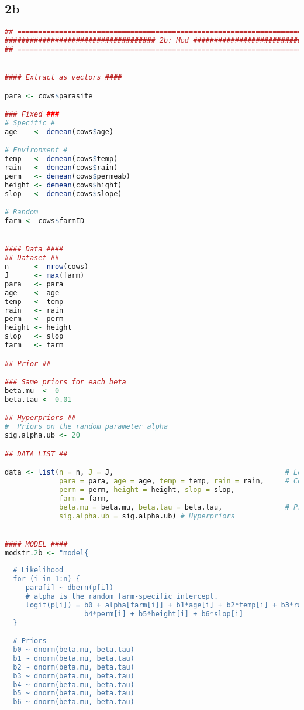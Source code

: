 \documentclass[11pt]{article}
\begin{document}
\subsection{2b} \label{appA2b}
\begin{lstlisting}[language=R]
## ===========================================================================##
#################################### 2b: Mod ###################################
## ===========================================================================##


#### Extract as vectors ####

para <- cows$parasite

### Fixed ###
# Specific #
age    <- demean(cows$age)

# Environment #
temp   <- demean(cows$temp)
rain   <- demean(cows$rain)
perm   <- demean(cows$permeab)
height <- demean(cows$hight)
slop   <- demean(cows$slope)

# Random
farm <- cows$farmID


#### Data ####
## Dataset ##
n      <- nrow(cows)
J      <- max(farm)
para   <- para
age    <- age
temp   <- temp
rain   <- rain
perm   <- perm
height <- height
slop   <- slop
farm   <- farm

## Prior ##

### Same priors for each beta
beta.mu  <- 0
beta.tau <- 0.01

## Hyperpriors ##
#  Priors on the random parameter alpha
sig.alpha.ub <- 20

## DATA LIST ##

data <- list(n = n, J = J,                                         # Loop idx
             para = para, age = age, temp = temp, rain = rain,     # Covariates
             perm = perm, height = height, slop = slop, 
             farm = farm, 
             beta.mu = beta.mu, beta.tau = beta.tau,               # Priors
             sig.alpha.ub = sig.alpha.ub) # Hyperpriors


#### MODEL ####
modstr.2b <- "model{
  
  # Likelihood
  for (i in 1:n) {
     para[i] ~ dbern(p[i])
     # alpha is the random farm-specific intercept. 
     logit(p[i]) = b0 + alpha[farm[i]] + b1*age[i] + b2*temp[i] + b3*rain[i] + 
                   b4*perm[i] + b5*height[i] + b6*slop[i]
  }

  # Priors
  b0 ~ dnorm(beta.mu, beta.tau)
  b1 ~ dnorm(beta.mu, beta.tau)
  b2 ~ dnorm(beta.mu, beta.tau)
  b3 ~ dnorm(beta.mu, beta.tau)
  b4 ~ dnorm(beta.mu, beta.tau)
  b5 ~ dnorm(beta.mu, beta.tau)
  b6 ~ dnorm(beta.mu, beta.tau)
  

\end{lstlisting}
\end{document}

